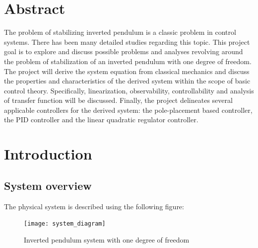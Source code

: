 \documentclass [12pt,letterpaper]{exam}
\begin{document}
\newpage
\tableofcontents
\newpage

\noindent
\section{Abstract}
The problem of stabilizing inverted pendulum is a classic problem in control systems. There has been many detailed studies regarding this topic. This project goal is to explore and discuss possible problems and analyses revolving around the problem of stabilization of an inverted pendulum with one degree of freedom. The project will derive the system equation from classical mechanics and discuss the properties and characteristics of the derived system within the scope of basic control theory. Specifically, linearization, observability, controllability and analysis of transfer function will be discussed. Finally, the project delineates several applicable controllers for the derived system: the pole-placement based controller, the PID controller and the linear quadratic regulator controller.
\newpage

\section{Introduction}
\subsection{System overview}
The physical system is described using the following figure:
\begin{figure}[H]
  \centering
    \texttt{[image: system\_diagram]} 
  \caption{Inverted pendulum system with one degree of freedom}
  \label{fig:system_diagram}
\end{figure}
\end{document}
